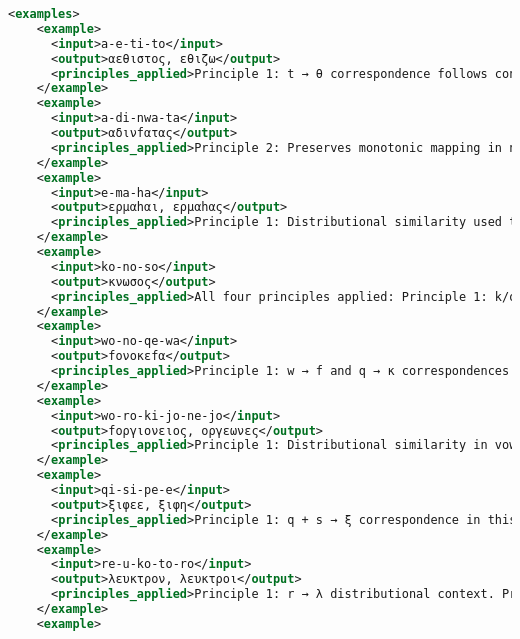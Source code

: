 \begin{lstlisting}[style=mystyle, language=XML, breaklines=true]
  <examples>
    <example>
      <input>a-e-ti-to</input>
      <output>αεθιστος, εθιζω</output>
      <principles_applied>Principle 1: t → θ correspondence follows consistent patterns. Principle 2: Preserves monotonic ordering of phonemes. Principle 3: Maintains one-to-one mapping between Linear B and Greek sounds.</principles_applied>
    </example>
    <example>
      <input>a-di-nwa-ta</input>
      <output>αδινfατας</output>
      <principles_applied>Principle 2: Preserves monotonic mapping in nw → νf sequence. Principle 4: Consistent handling of digamma (w → f) reinforces observed patterns.</principles_applied>
    </example>
    <example>
      <input>e-ma-ha</input>
      <output>ερμαhαι, ερμαhας</output>
      <principles_applied>Principle 1: Distributional similarity used to infer ρ. Principle 3: Structural sparsity maintained with one-to-one sound mapping. Principle 4: Consistent h-series representation.</principles_applied>
    </example>
    <example>
      <input>ko-no-so</input>
      <output>κνωσος</output>
      <principles_applied>All four principles applied: Principle 1: k/o sound correspondence. Principle 2: Monotonic ordering preserved. Principle 3: One-to-one mapping. Principle 4: Aligns with known patterns for toponyms.</principles_applied>
    </example>
    <example>
      <input>wo-no-qe-wa</input>
      <output>fονοκεfα</output>
      <principles_applied>Principle 1: w → f and q → κ correspondences follow consistent patterns. Principle 2: Monotonic ordering preserved. Principle 4: Reinforces observed digamma patterns.</principles_applied>
    </example>
    <example>
      <input>wo-ro-ki-jo-ne-jo</input>
      <output>fοργιονειος, οργεωνες</output>
      <principles_applied>Principle 1: Distributional similarity in vowel sequences. Principle 2: Preserves monotonic mapping. Principle 4: Aligns with suffix transformation patterns.</principles_applied>
    </example>
    <example>
      <input>qi-si-pe-e</input>
      <output>ξιφεε, ξιφη</output>
      <principles_applied>Principle 1: q + s → ξ correspondence in this context. Principle 3: Maintains sparse one-to-one mapping. Principle 4: Vowel contraction pattern (e-e → η) follows established rules.</principles_applied>
    </example>
    <example>
      <input>re-u-ko-to-ro</input>
      <output>λευκτρον, λευκτροι</output>
      <principles_applied>Principle 1: r → λ distributional context. Principle 2: Preserves monotonic mapping. Principle 3: Maintains sparse mapping in consonant clusters. Principle 4: Aligns with known toponym patterns.</principles_applied>
    </example>
    <example>

\end{lstlisting}

